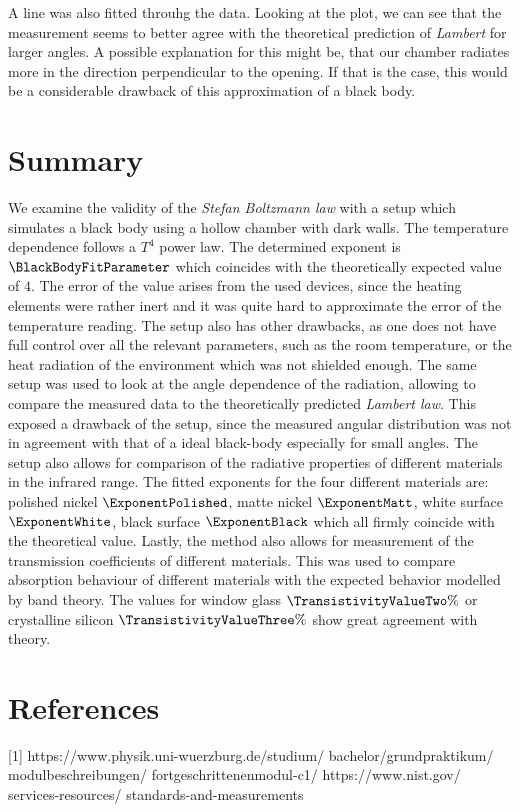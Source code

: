 \documentclass[a4paper,10pt,twocolumn]{article}
\begin{document}
    A line was also fitted throuhg the data.
    Looking at the plot, we can see that the measurement seems to better agree with the theoretical prediction of \textit{Lambert} for larger angles.
    A possible explanation for this might be, that our chamber radiates more in the direction perpendicular to the opening.
    If that is the case, this would be a considerable drawback of this approximation of a black body.
    
    
    
    
    \section{Summary}
    We examine the validity of the \textit{Stefan Boltzmann law} with a setup which simulates a black body using a hollow chamber with dark walls.
    The temperature dependence follows a $T^4$ power law.
    The determined exponent is $\BlackBodyFitParameter$ which coincides with the theoretically expected value of $4$.
    The error of the value arises from the used devices, since the heating elements were rather inert and it was quite hard to approximate the error of the temperature reading.
    The setup also has other drawbacks, as one does not have full control over all the relevant parameters, such as the room temperature, or the heat radiation of the environment
    which was not shielded enough.
    The same setup was used to look at the angle dependence of the radiation, allowing to compare the measured data to the theoretically predicted \textit{Lambert law}.
    This exposed a drawback of the setup, since the measured angular distribution was not in agreement with that of a ideal black-body
    especially for small angles.
    The setup also allows for comparison of the radiative properties of different materials in the infrared range.
    The fitted exponents for the four different materials are: polished nickel $\ExponentPolished$, matte nickel $\ExponentMatt$,
    white surface $\ExponentWhite$, black surface $\ExponentBlack$ which all firmly coincide with the theoretical value.
    Lastly, the method also allows for measurement of the transmission coefficients of different materials.
    This was used to compare absorption behaviour of different materials with the expected behavior modelled by band theory.
    The values for window glass $\TransistivityValueTwo \% $ or crystalline silicon $\TransistivityValueThree \%$ show great agreement with theory.
    
    
    
    \section{References}
    [1] https://www.physik.uni-wuerzburg.de/studium/ bachelor/grundpraktikum/ modulbeschreibungen/ fortgeschrittenenmodul-c1/
    \newline
    [2] https://www.nist.gov/ services-resources/ standards-and-measurements
\end{document}
